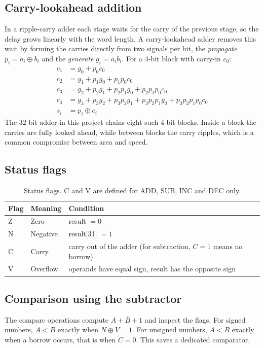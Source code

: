 \documentclass[11pt,a4paper]{article}
\begin{document}
\subsection{Carry-lookahead addition}
In a ripple-carry adder each stage waits for the carry of the previous stage, so the delay grows linearly with the word length. A carry-lookahead adder removes this wait by forming the carries directly from two signals per bit, the \emph{propagate} $p_i = a_i \oplus b_i$ and the \emph{generate} $g_i = a_i b_i$. For a 4-bit block with carry-in $c_0$:
\begin{align*}
c_1 &= g_0 + p_0 c_0\\
c_2 &= g_1 + p_1 g_0 + p_1 p_0 c_0\\
c_3 &= g_2 + p_2 g_1 + p_2 p_1 g_0 + p_2 p_1 p_0 c_0\\
c_4 &= g_3 + p_3 g_2 + p_3 p_2 g_1 + p_3 p_2 p_1 g_0 + p_3 p_2 p_1 p_0 c_0\\
s_i &= p_i \oplus c_i
\end{align*}
The 32-bit adder in this project chains eight such 4-bit blocks. Inside a block the carries are fully looked ahead, while between blocks the carry ripples, which is a common compromise between area and speed.

\subsection{Status flags}
\begin{table}[H]\centering
\begin{tabular}{@{}lll@{}}\toprule
Flag & Meaning & Condition\\\midrule
Z & Zero & result $=0$\\
N & Negative & result[31] $=1$\\
C & Carry & carry out of the adder (for subtraction, $C=1$ means no borrow)\\
V & Overflow & operands have equal sign, result has the opposite sign\\\bottomrule
\end{tabular}
\caption{Status flags. C and V are defined for ADD, SUB, INC and DEC only.}
\end{table}

\subsection{Comparison using the subtractor}
The compare operations compute $A + \overline{B} + 1$ and inspect the flags. For signed numbers, $A<B$ exactly when $N \oplus V = 1$. For unsigned numbers, $A<B$ exactly when a borrow occurs, that is when $C=0$. This saves a dedicated comparator.
\end{document}
